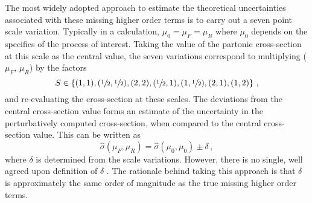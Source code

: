 \documentclass[main.tex]{subfiles}
\begin{document}
    The most widely adopted approach to estimate the
    theoretical uncertainties associated with these
    missing higher order terms is to carry out a seven point
    scale variation. Typically in a calculation,
    $\mu_{0} = \mu_{F} = \mu_{R}$ where $\mu_{0}$ depends on the specifics
    of the process of interest. Taking the value of the
    partonic cross-section at this scale as the central value,
    the seven variations correspond to multiplying ($\mu_{F}, \, \mu_{R}$) by the factors 
    \begin{equation}\label{eqn:scale_variations}
        S \in \left\{(1, 1), (\sfrac{1}{2}, \sfrac{1}{2}), (2, 2), (\sfrac{1}{2}, 1), (1, \sfrac{1}{2}), (2, 1), (1, 2) \right\} \, ,
    \end{equation}
    and re-evaluating the cross-section at these scales.
    The deviations from the central cross-section value
    forms an estimate of the uncertainty in the perturbatively
    computed cross-section, when compared to the central cross-section value.
    This can be written as
    \begin{equation}
        \hat{\sigma}(\mu_{F}, \mu_{R}) = \hat{\sigma}(\mu_{0}, \mu_{0}) \pm \delta \, ,
    \end{equation}
    where $\delta$ is determined from the scale variations.
    However, there is no single, well agreed upon definition
    of $\delta$ \cite{Cacciari:2011ze}.
    The rationale behind taking this approach is that $\delta$
    is approximately the same order of magnitude as the true missing
    higher order terms.
\end{document}
